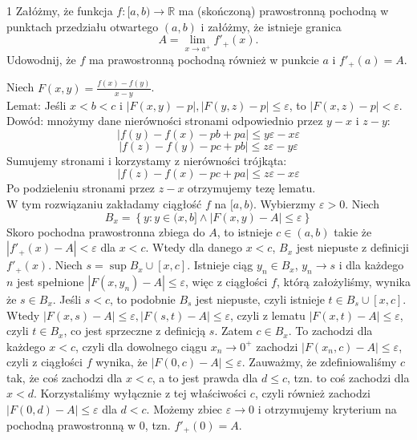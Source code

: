 \documentclass{../note}
\begin{document}
\begin{zadanie}{1}
Załóżmy, że funkcja $f : [a, b) \to \mathbb{R}$ ma (skończoną) prawostronną pochodną w punktach przedziału otwartego $(a, b)$ i załóżmy, że istnieje granica
\[ A = \lim_{x \to a^+} f'_+(x). \]
Udowodnij, że $f$ ma prawostronną pochodną również w punkcie $a$ i $f'_+(a) = A$.
\end{zadanie}
\begin{rozwiazanie}
Niech $F(x, y) = \frac{f(x) - f(y)}{x - y}$.\\
Lemat: Jeśli $x < b < c$ i $|F(x, y) - p|, |F(y, z) - p| \leq \varepsilon$, to $|F(x, z) - p| < \varepsilon$. Dowód: mnożymy dane nierówności stronami odpowiednio przez $y - x$ i $z - y$:
\[|f(y) - f(x) - pb + pa| \leq y\varepsilon - x\varepsilon\]
\[|f(z) - f(y) - pc + pb| \leq z\varepsilon - y\varepsilon\]
Sumujemy stronami i korzystamy z nierówności trójkąta:
\[|f(z) - f(x) - pc + pa| \leq z\varepsilon - x\varepsilon\]
Po podzieleniu stronami przez $z - x$ otrzymujemy tezę lematu.\\
W tym rozwiązaniu zakładamy ciągłość $f$ na $[a, b)$. Wybierzmy $\varepsilon > 0$. Niech
\[B_x = \left\{y : y \in (x, b] \land |F(x, y) - A| \leq \varepsilon\right\}\]
Skoro pochodna prawostronna zbiega do $A$, to istnieje $c \in (a, b)$ takie że $|f'_+(x) - A| < \varepsilon$ dla $x < c$. Wtedy dla danego $x < c$, $B_x$ jest niepuste z definicji $f'_+(x)$. Niech $s = \sup B_x \cup [x, c]$. Istnieje ciąg $y_n \in B_x$, $y_n \to s$ i dla każdego $n$ jest spełnione $|F(x, y_n) - A| \leq \varepsilon$, więc z ciągłości $f$, którą założyliśmy, wynika że $s \in B_x$. Jeśli $s < c$, to podobnie $B_s$ jest niepuste, czyli istnieje $t \in B_s \cup [x, c]$. Wtedy $|F(x, s) - A| \leq \varepsilon, |F(s, t) - A| \leq \varepsilon$, czyli z lematu $|F(x, t) - A| \leq \varepsilon$, czyli $t \in B_x$, co jest sprzeczne z definicją $s$. Zatem $c \in B_x$. To zachodzi dla każdego $x < c$, czyli dla dowolnego ciągu $x_n \to 0^+$ zachodzi $|F(x_n, c) - A| \leq \varepsilon$, czyli z ciągłości $f$ wynika, że $|F(0, c) - A| \leq \varepsilon$. Zauważmy, że zdefiniowaliśmy $c$ tak, że coś zachodzi dla $x < c$, a to jest prawda dla $d \leq c$, tzn. to coś zachodzi dla $x < d$. Korzystaliśmy wyłącznie z tej właściwości $c$, czyli również zachodzi $|F(0, d) - A| \leq \varepsilon$ dla $d < c$. Możemy zbiec $\varepsilon \to 0$ i otrzymujemy kryterium na pochodną prawostronną w 0, tzn. $f'_+(0) = A$.
\end{rozwiazanie}
\end{document}
